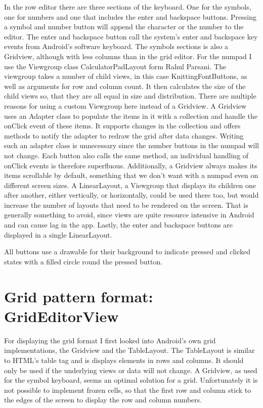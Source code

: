 \documentclass[a4paper,11pt]{kth-mag}
\begin{document}
In the row editor there are three sections of the keyboard. One for the symbols, one for numbers and one that includes the enter and backspace buttons. Pressing a symbol and number button will append the character or the number to the editor. The enter and backspace button call the system’s enter and backspace key events from Android’s software keyboard.
The symbols sections is also a Gridview, although with less columns than in the grid editor. For the numpad I use the Viewgroup class CalculatorPadLayout form Rahul Parsani. The viewgroup takes a number of child views, in this case KnittingFontButtons, as well as arguments for row and column count. It then calculates the size of the child views so, that they are all equal in size and distribution. There are multiple reasons for using a custom Viewgroup here instead of a Gridview. A Gridview uses an Adapter class to populate the items in it with a collection and handle the onClick event of these items. It supports changes in the collection and offers methods to notify the adapter to redraw the grid after data changes. Writing such an adapter class is unnecessary since the number buttons in the numpad will not change. Each button also calls the same method, an individual handling of onClick events is therefore superfluous. Additionally, a Gridview always makes its items scrollable by default, something that we don’t want with a numpad even on different screen sizes. A LinearLayout, a Viewgroup that displays its children one after another, either vertically, or horizontally, could be used there too, but would increase the number of layouts that need to be rendered on the screen. That is generally something to avoid, since views are quite resource intensive in Android and can cause lag in the app. Lastly, the enter and backspace buttons are displayed in a single LinearLayout.

All buttons use a drawable for their background to indicate pressed and clicked states with a filled circle round the pressed button.

\section{Grid pattern format: GridEditorView}
For displaying the grid format I first looked into Android’s own grid implementations, the Gridview and the TableLayout. The TableLayout is similar to HTML’s table tag and is displays elements in rows and columns. It should only be used if the underlying views or data will not change. A Gridview, as used for the symbol keyboard, seems an optimal solution for a grid. Unfortunately it is not possible to implement frozen cells, so that the first row and column stick to the edges of the screen to display the row and column numbers.
\end{document}
